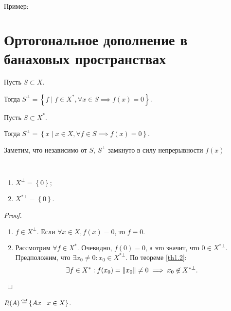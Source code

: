 Пример: \todo

\section{Ортогональное дополнение в банаховых пространствах}


\begin{definition}
	Пусть $S \subset X$.

	Тогда $S^\bot = \left\{ f \mid f \in X^*, \forall x \in S \implies f(x) = 0 \right\}$.
\end{definition}

\begin{definition}
	Пусть $S \subset X^*$.

	 Тогда $S^\bot = \left\{ x \mid x \in X, \forall f \in S \implies f(x) = 0 \right\}$.
\end{definition}
Заметим, что независимо от $S$, $S^\bot$ замкнуто в силу непрерывности $f(x)$

\begin{statement} \ 
	\begin{enumerate}
		\item $X^\bot = \left\{ 0\right\}$;
		\item $X^{*\bot} = \left\{ 0\right\}$.
	\end{enumerate}
\end{statement}
\begin{proof}\ 
	\begin{enumerate}
		\item $f \in X^\bot$. Если $\forall x \in X, f(x) = 0 $, то $f \equiv 0$.
		\item Рассмотрим $\forall f \in X^*$. Очевидно, $f(0) = 0$, а это значит, что $0 \in X^{*\bot}$.
            Предположим, что $\exists x_0 \neq 0 : x_0 \in X^{*\bot}$.
            По теореме \ref{th1.2}:
            \[
                \exists f \in X^* : f(x_0) = \left\|x_0\right\| \neq 0 \implies x_0 \not\in X^{*\bot}\text{.} \qedhere
            \]
	\end{enumerate}
\end{proof}

\begin{definition}
	$R(A) \defeq \left\{ Ax \mid x \in X\right\}$.
\end{definition}

